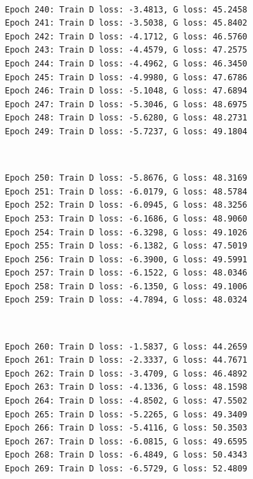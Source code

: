\documentclass[11pt]{article}
\begin{document}
    \begin{center}
    \end{center}
    { \hspace*{\fill} \\}
    
    \begin{Verbatim}[commandchars=\\\{\}]
Epoch 240: Train D loss: -3.4813, G loss: 45.2458
Epoch 241: Train D loss: -3.5038, G loss: 45.8402
Epoch 242: Train D loss: -4.1712, G loss: 46.5760
Epoch 243: Train D loss: -4.4579, G loss: 47.2575
Epoch 244: Train D loss: -4.4962, G loss: 46.3450
Epoch 245: Train D loss: -4.9980, G loss: 47.6786
Epoch 246: Train D loss: -5.1048, G loss: 47.6894
Epoch 247: Train D loss: -5.3046, G loss: 48.6975
Epoch 248: Train D loss: -5.6280, G loss: 48.2731
Epoch 249: Train D loss: -5.7237, G loss: 49.1804

    \end{Verbatim}

    \begin{center}
    \end{center}
    { \hspace*{\fill} \\}
    
    \begin{Verbatim}[commandchars=\\\{\}]
Epoch 250: Train D loss: -5.8676, G loss: 48.3169
Epoch 251: Train D loss: -6.0179, G loss: 48.5784
Epoch 252: Train D loss: -6.0945, G loss: 48.3256
Epoch 253: Train D loss: -6.1686, G loss: 48.9060
Epoch 254: Train D loss: -6.3298, G loss: 49.1026
Epoch 255: Train D loss: -6.1382, G loss: 47.5019
Epoch 256: Train D loss: -6.3900, G loss: 49.5991
Epoch 257: Train D loss: -6.1522, G loss: 48.0346
Epoch 258: Train D loss: -6.1350, G loss: 49.1006
Epoch 259: Train D loss: -4.7894, G loss: 48.0324

    \end{Verbatim}

    \begin{center}
    \end{center}
    { \hspace*{\fill} \\}
    
    \begin{Verbatim}[commandchars=\\\{\}]
Epoch 260: Train D loss: -1.5837, G loss: 44.2659
Epoch 261: Train D loss: -2.3337, G loss: 44.7671
Epoch 262: Train D loss: -3.4709, G loss: 46.4892
Epoch 263: Train D loss: -4.1336, G loss: 48.1598
Epoch 264: Train D loss: -4.8502, G loss: 47.5502
Epoch 265: Train D loss: -5.2265, G loss: 49.3409
Epoch 266: Train D loss: -5.4116, G loss: 50.3503
Epoch 267: Train D loss: -6.0815, G loss: 49.6595
Epoch 268: Train D loss: -6.4849, G loss: 50.4343
Epoch 269: Train D loss: -6.5729, G loss: 52.4809

    \end{Verbatim}
\end{document}

